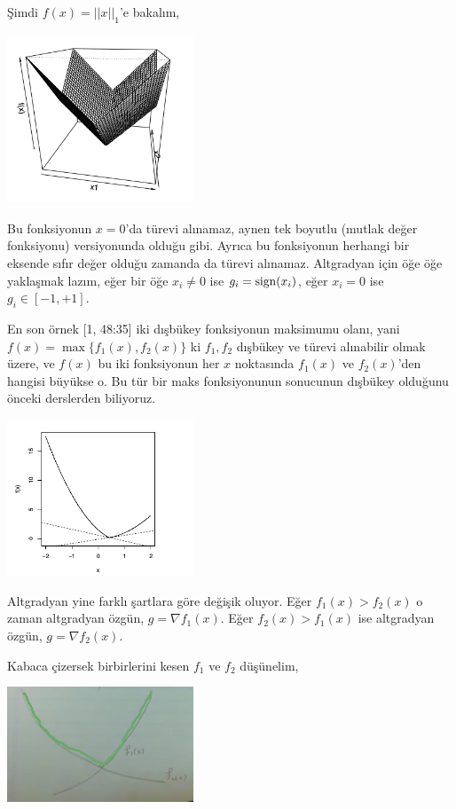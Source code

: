 \documentclass[12pt,fleqn]{article}\usepackage{../../common}
\begin{document}
Şimdi $f(x) = ||x||_1$'e bakalım,

\includegraphics[width=15em]{func_42_subgrad_04.png}

Bu fonksiyonun $x=0$'da türevi alınamaz, aynen tek boyutlu (mutlak değer
fonksiyonu) versiyonunda olduğu gibi. Ayrıca bu fonksiyonun herhangi bir
eksende sıfır değer olduğu zamanda da türevi alınamaz. Altgradyan için öğe öğe
yaklaşmak lazım, eğer bir öğe $x_i \ne 0$ ise $g_i = \operatorname{sign}(x_i)$, eğer
$x_i = 0$ ise $g_i \in [-1,+1]$.

En son örnek [1, 48:35] iki dışbükey fonksiyonun maksimumu olanı, yani
$f(x) = \max \{f_1(x),f_2(x) \}$ ki $f_1,f_2$ dışbükey ve türevi alınabilir
olmak üzere, ve $f(x)$ bu iki fonksiyonun her $x$ noktasında $f_1(x)$ ve
$f_2(x)$'den hangisi büyükse o. Bu tür bir maks fonksiyonunun sonucunun
dışbükey olduğunu önceki derslerden biliyoruz.

\includegraphics[width=15em]{func_42_subgrad_05.png}

Altgradyan yine farklı şartlara göre değişik oluyor. Eğer $f_1(x) > f_2(x)$
o zaman altgradyan özgün, $g = \nabla f_1(x)$. Eğer $f_2(x) > f_1(x)$ ise
altgradyan özgün, $g = \nabla f_2(x)$. 

Kabaca çizersek birbirlerini kesen $f_1$ ve $f_2$ düşünelim, 

\includegraphics[width=15em]{func_42_subgrad_06.png}
\end{document}
